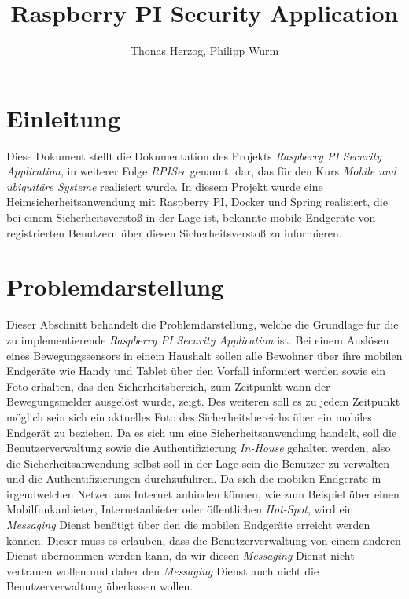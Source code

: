 \documentclass[]{article}
\title{Raspberry PI Security Application}
\author{Thonas Herzog, Philipp Wurm}
\begin{document}
\maketitle

\begin{abstract}
\end{abstract}

\section{Einleitung}
Diese Dokument stellt die Dokumentation des Projekts \emph{Raspberry PI Security Application}, in weiterer Folge \emph{RPISec} genannt, dar, das für den Kurs \emph{Mobile und ubiquitäre Systeme} realisiert wurde. In diesem Projekt wurde eine Heimsicherheitsanwendung mit Raspberry PI, Docker und Spring realisiert, die bei einem Sicherheitsverstoß in der Lage ist, bekannte mobile Endgeräte von registrierten Benutzern über diesen Sicherheitsverstoß zu informieren. 

\section{Problemdarstellung}
Dieser Abschnitt behandelt die Problemdarstellung, welche die Grundlage für die zu implementierende \emph{Raspberry PI Security Application} ist. Bei einem Auslösen eines Bewegungssensors in einem Haushalt sollen alle Bewohner über ihre mobilen Endgeräte wie Handy und Tablet über den Vorfall informiert werden sowie ein Foto erhalten, das den Sicherheitsbereich, zum Zeitpunkt wann der Bewegungsmelder ausgelöst wurde, zeigt. Des weiteren soll es zu jedem Zeitpunkt möglich sein sich ein aktuelles Foto des Sicherheitsbereichs über ein mobiles Endgerät zu beziehen.  
\newline
\newline
Da es sich um eine Sicherheitsanwendung handelt, soll die Benutzerverwaltung sowie die Authentifizierung \emph{In-House} gehalten werden, also die Sicherheitsanwendung selbst soll in der Lage sein die Benutzer zu verwalten und die Authentifizierungen durchzuführen. Da sich die mobilen Endgeräte in irgendwelchen Netzen ans Internet anbinden können, wie zum Beispiel über einen Mobilfunkanbieter, Internetanbieter oder öffentlichen \emph{Hot-Spot}, wird ein \emph{Messaging} Dienst benötigt über den die mobilen Endgeräte erreicht werden können. Dieser muss es erlauben, dass die Benutzerverwaltung von einem anderen Dienst übernommen werden kann, da wir diesen \emph{Messaging} Dienst nicht vertrauen wollen und daher den \emph{Messaging} Dienst auch nicht die Benutzerverwaltung überlassen wollen.
\end{document}
